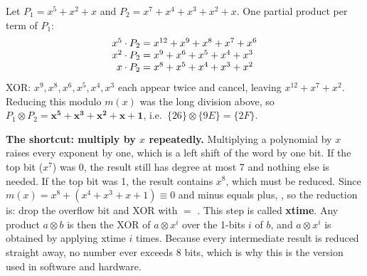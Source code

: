 \begin{worked}
Let $P_1 = x^5 + x^2 + x$ and $P_2 = x^7 + x^4 + x^3 + x^2 + x$. One partial product per term of $P_1$:
\[
\begin{array}{@{}r@{\;=\;}l@{}}
x^5 \cdot P_2 & x^{12} + x^9 + x^8 + x^7 + x^6\\
x^2 \cdot P_2 & x^9 + x^6 + x^5 + x^4 + x^3\\
x \cdot P_2 & x^8 + x^5 + x^4 + x^3 + x^2
\end{array}
\]
XOR: $x^9, x^8, x^6, x^5, x^4, x^3$ each appear twice and cancel, leaving $x^{12} + x^7 + x^2$. Reducing this modulo $m(x)$ was the long division above, so
$P_1 \otimes P_2 = \mathbf{x^5 + x^3 + x^2 + x + 1}$, i.e.\ $\{26\} \otimes \{9E\} = \{2F\}$.
\end{worked}

\textbf{The shortcut: multiply by $x$ repeatedly.} Multiplying a polynomial by $x$ raises every exponent by one, which is a left shift of the word by one bit. If the top bit ($x^7$) was 0, the result still has degree at most 7 and nothing else is needed. If the top bit was 1, the result contains $x^8$, which must be reduced. Since $m(x) = x^8 + (x^4 + x^3 + x + 1) \equiv 0$ and minus equals plus, , so the reduction is: drop the overflow bit and XOR with  $=$ . This step is called \textbf{xtime}. Any product $a \otimes b$ is then the XOR of $a \otimes x^i$ over the 1-bits $i$ of $b$, and $a \otimes x^i$ is obtained by applying xtime $i$ times. Because every intermediate result is reduced straight away, no number ever exceeds 8 bits, which is why this is the version used in software and hardware.


